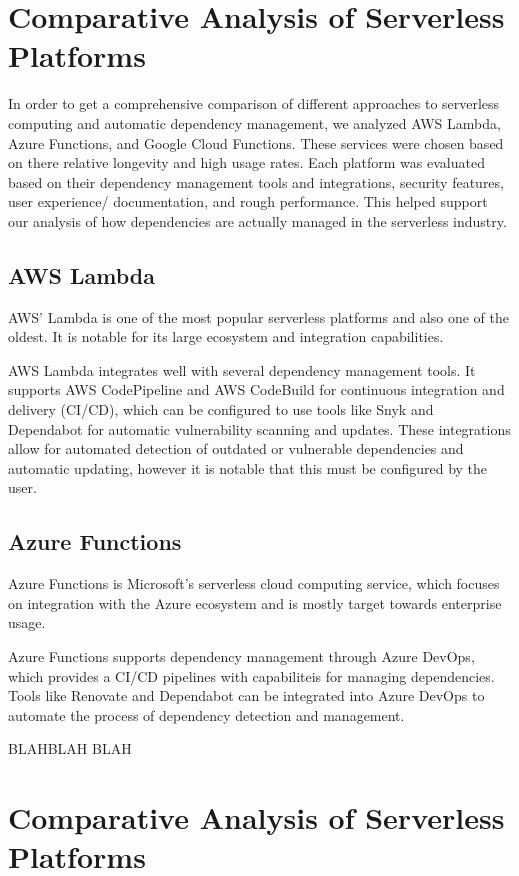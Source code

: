 \documentclass[sigconf]{acmart}
\begin{document}
\section{Comparative Analysis of Serverless Platforms}

In order to get a comprehensive comparison of different approaches to serverless computing and automatic dependency management, we analyzed AWS Lambda, Azure Functions, and Google Cloud Functions. These services were chosen based on there relative longevity and high usage rates. Each platform was evaluated based on their dependency management tools and integrations, security features, user experience/ documentation, and rough performance. This helped support our analysis of how dependencies are actually managed in the serverless industry.

\subsection{AWS Lambda}

AWS' Lambda is one of the most popular serverless platforms and also one of the oldest. It is notable for its large ecosystem and integration capabilities.

AWS Lambda integrates well with several dependency management tools. It supports AWS CodePipeline and AWS CodeBuild for continuous integration and delivery (CI/CD), which can be configured to use tools like Snyk and Dependabot for automatic vulnerability scanning and updates. These integrations allow for automated detection of outdated or vulnerable dependencies and automatic updating, however it is notable that this must be configured by the user.

\subsection{Azure Functions}

Azure Functions is Microsoft's serverless cloud computing service, which focuses on integration with the Azure ecosystem and is mostly target towards enterprise usage.

Azure Functions supports dependency management through Azure DevOps, which provides a CI/CD pipelines with capabiliteis for managing dependencies. Tools like Renovate and Dependabot can be integrated into Azure DevOps to automate the process of dependency detection and management.

BLAHBLAH BLAH

\section{Comparative Analysis of Serverless Platforms}
\end{document}
